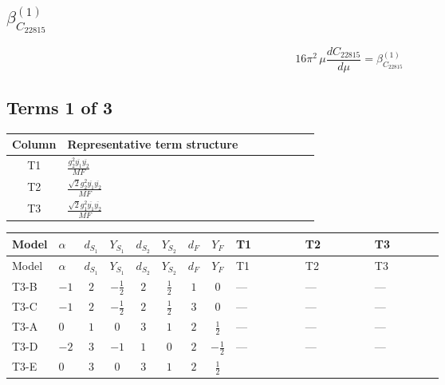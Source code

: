 \documentclass[8pt]{article}
\begin{document}
\begin{landscape}
\section*{$\beta_{C_{22815}}^{(1)}$}
\[16\pi^2\,\mu\frac{d C_{22815}}{d\mu}=\beta_{C_{22815}}^{(1)}\]
\subsection*{Terms 1 of 3}
\begin{center}
\begin{tabular}{@{}c >{\raggedright\arraybackslash}p{0.82\linewidth}@{}}
\toprule
Column & Representative term structure \\
\midrule
T1 & \(\displaystyle \frac{g_{2}^{2} \overline{y_{1}} \overline{y_{2}}}{MF}\) \\
\midrule
T2 & \(\displaystyle \frac{\sqrt{2} g_{2}^{2} \overline{y_{1}} \overline{y_{2}}}{MF}\) \\
\midrule
T3 & \(\displaystyle \frac{\sqrt{2} g_{1}^{2} \overline{y_{1}} \overline{y_{2}}}{MF}\) \\
\midrule
\bottomrule
\end{tabular}
\end{center}
\smallskip
\tiny
\begin{longtable}{@{}llcccccc >{\raggedright\arraybackslash}p{0.21\linewidth} >{\raggedright\arraybackslash}p{0.21\linewidth} >{\raggedright\arraybackslash}p{0.21\linewidth}@{}}
\toprule
Model & $\alpha$ & $d_{S_1}$ & $Y_{S_1}$ & $d_{S_2}$ & $Y_{S_2}$ & $d_F$ & $Y_F$ & T1 & T2 & T3 \\
\midrule
\endfirsthead
\toprule
Model & $\alpha$ & $d_{S_1}$ & $Y_{S_1}$ & $d_{S_2}$ & $Y_{S_2}$ & $d_F$ & $Y_F$ & T1 & T2 & T3 \\
\midrule
\endhead
T3-B & $-1$ & $2$ & $-\frac{1}{2}$ & $2$ & $\frac{1}{2}$ & $1$ & $0$ & --- & --- & --- \\
\midrule
T3-C & $-1$ & $2$ & $-\frac{1}{2}$ & $2$ & $\frac{1}{2}$ & $3$ & $0$ & --- & --- & --- \\
\midrule
T3-A & $0$ & $1$ & $0$ & $3$ & $1$ & $2$ & $\frac{1}{2}$ & --- & --- & --- \\
\midrule
T3-D & $-2$ & $3$ & $-1$ & $1$ & $0$ & $2$ & $-\frac{1}{2}$ & --- & --- & --- \\
\midrule
T3-E & $0$ & $3$ & $0$ & $3$ & $1$ & $2$ & $\frac{1}{2}$ & \scriptsize\adjustbox{max width=\linewidth}{$\begin{gathered} - \frac{g_{2}^{2} \overline{y_{1}} \overline{y_{2}}}{MF}\end{gathered}$} & \scriptsize\adjustbox{max width=\linewidth}{$\begin{gathered} - \frac{49 \sqrt{2} g_{2}^{2} \overline{y_{1}} \overline{y_{2}}}{16 MF}\end{gathered}$} & \scriptsize\adjustbox{max width=\linewidth}{$\begin{gathered} - \frac{3 \sqrt{2} g_{1}^{2} \overline{y_{1}} \overline{y_{2}}}{16 MF}\end{gathered}$} \\
\midrule
\bottomrule
\end{longtable}
\clearpage

\end{landscape}
\end{document}
